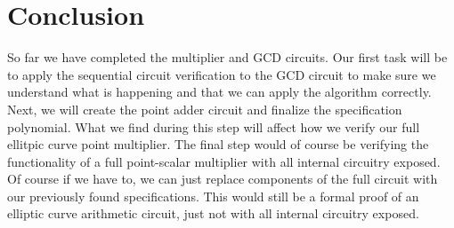 \documentclass[12pt]{report}
\begin{document}
\fi



\section{Conclusion}
So far we have completed the multiplier and GCD circuits. Our first task will be to apply the sequential circuit verification to the GCD circuit to make sure we understand what is happening and that we can apply the algorithm correctly. Next, we will create the point adder circuit and finalize the specification polynomial. What we find during this step will affect how we verify our full ellitpic curve point multiplier. The final step would of course be verifying the functionality of a full point-scalar multiplier with all internal circuitry exposed. Of course if we have to, we can just replace components of the full circuit with our previously found specifications. This would still be a formal proof of an elliptic curve arithmetic circuit, just not with all internal circuitry exposed. 



\end{document}

